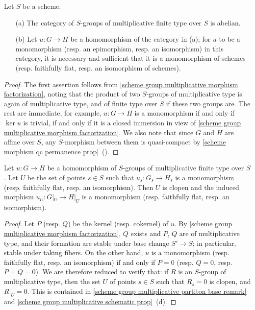 \begin{corollary}\label{scheme group multiplicative morphism ft category prop}
Let $S$ be a scheme.
\begin{enumerate}
    \item[(a)] The category of $S$-groups of multiplicative finite type over $S$ is abelian.
    \item[(b)] Let $u:G\to H$ be a homomorphism of the category in (a); for $u$ to be a monomorphism (resp. an epimorphism, resp. an isomorphism) in this category, it is necessary and sufficient that it is a monomorphism of schemes (resp. faithfully flat, resp. an isomorphism of schemes).
\end{enumerate}
\end{corollary}
\begin{proof}
The first assertion follows from \cref{scheme group multiplicative morphism factorization}, noting that the product of two $S$-groups of multiplicative type is again of multiplicative type, and of finite type over $S$ if these two groups are. The rest are immediate, for example, $u:G\to H$ is a monomorphism if and only if $\ker u$ is trivial, if and only if it is a closed immersion in view of \cref{scheme group multiplicative morphism factorization}. We also note that since $G$ and $H$ are affine over $S$, any $S$-morphism between them is quasi-compact by \cref{scheme morphism qc permanence prop}~().
\end{proof}

\begin{corollary}\label{scheme group multiplicative ft mono epi locus prop}
Let $u:G\to H$ be a homomorphism of $S$-groups of multiplicative finite type over $S$. Let $U$ be the set of points $s\in S$ such that $u_s:G_s\to H_s$ is a monomorphism (resp. faithfully flat, resp. an isomorphism). Then $U$ is clopen and the induced morphism $u_U:G|_U\to H|_U$ is a monomorphism (resp. faithfully flat, resp. an isomorphism).
\end{corollary}
\begin{proof}
Let $P$ (resp. $Q$) be the kernel (resp. cokernel) of $u$. By \cref{scheme group multiplicative morphism factorization}, $Q$ exists and $P$, $Q$ are of multiplicative type, and their formation are stable under base change $S'\to S$; in particular, stable under taking fibers. On the other hand, $u$ is a monomorphism (resp. faithfully flat, resp. an isomorphism) if and only if $P=0$ (resp. $Q=0$, resp. $P=Q=0$). We are therefore reduced to verify that: if $R$ is an $S$-group of multiplicative type, then the set $U$ of points $s\in S$ such that $R_s=0$ is clopen, and $R|_U=0$. This is contained in \cref{scheme group multiplicative partiton base remark} and \cref{scheme group multiplicative schematic prop}~(d).
\end{proof}


